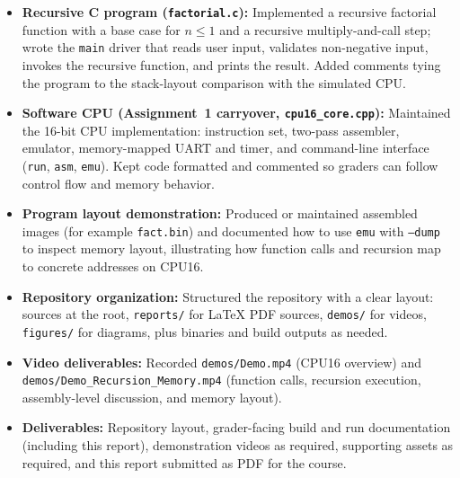 \documentclass[12pt]{article}
\begin{document}
\begin{itemize}
  \item \textbf{Recursive C program (\texttt{factorial.c}):} Implemented a recursive factorial function with a base case for $n \leq 1$ and a recursive multiply-and-call step; wrote the \texttt{main} driver that reads user input, validates non-negative input, invokes the recursive function, and prints the result. Added comments tying the program to the stack-layout comparison with the simulated CPU.
  \item \textbf{Software CPU (Assignment~1 carryover, \texttt{cpu16\_core.cpp}):} Maintained the 16-bit CPU implementation: instruction set, two-pass assembler, emulator, memory-mapped UART and timer, and command-line interface (\texttt{run}, \texttt{asm}, \texttt{emu}). Kept code formatted and commented so graders can follow control flow and memory behavior.
  \item \textbf{Program layout demonstration:} Produced or maintained assembled images (for example \texttt{fact.bin}) and documented how to use \texttt{emu} with \texttt{--dump} to inspect memory layout, illustrating how function calls and recursion map to concrete addresses on CPU16.
  \item \textbf{Repository organization:} Structured the repository with a clear layout: sources at the root, \texttt{reports/} for LaTeX PDF sources, \texttt{demos/} for videos, \texttt{figures/} for diagrams, plus binaries and build outputs as needed.
  \item \textbf{Video deliverables:} Recorded \texttt{demos/Demo.mp4} (CPU16 overview) and \texttt{demos/Demo\_Recursion\_Memory.mp4} (function calls, recursion execution, assembly-level discussion, and memory layout).
  \item \textbf{Deliverables:} Repository layout, grader-facing build and run documentation (including this report), demonstration videos as required, supporting assets as required, and this report submitted as PDF for the course.
\end{itemize}
\end{document}
